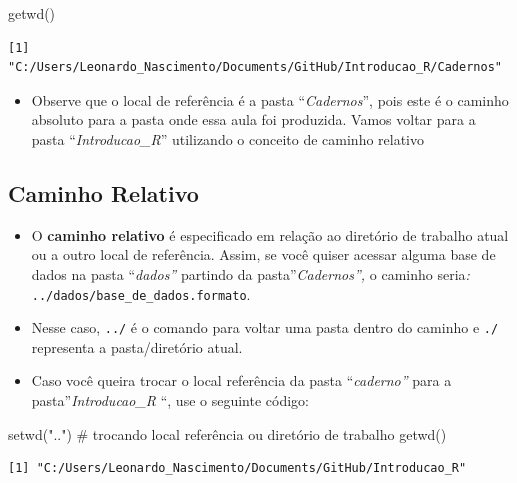 \documentclass[
  letterpaper,
  DIV=11,
  numbers=noendperiod]{scrartcl}
\newenvironment{Shaded}{\begin{snugshade}}{\end{snugshade}}
\newcommand{\CommentTok}[1]{\textcolor[rgb]{0.37,0.37,0.37}{#1}}
\newcommand{\FunctionTok}[1]{\textcolor[rgb]{0.28,0.35,0.67}{#1}}
\newcommand{\NormalTok}[1]{\textcolor[rgb]{0.00,0.23,0.31}{#1}}
\newcommand{\StringTok}[1]{\textcolor[rgb]{0.13,0.47,0.30}{#1}}
\providecommand{\tightlist}{%
  \setlength{\itemsep}{0pt}\setlength{\parskip}{0pt}}\usepackage{longtable,booktabs,array}
\begin{document}
\begin{Shaded}
\begin{Highlighting}[]
\FunctionTok{getwd}\NormalTok{()}
\end{Highlighting}
\end{Shaded}

\begin{verbatim}
[1] "C:/Users/Leonardo_Nascimento/Documents/GitHub/Introducao_R/Cadernos"
\end{verbatim}

\begin{itemize}
\tightlist
\item
  Observe que o local de referência é a pasta ``\emph{Cadernos}'', pois
  este é o caminho absoluto para a pasta onde essa aula foi produzida.
  Vamos voltar para a pasta ``\emph{Introducao\_R}'' utilizando o
  conceito de caminho relativo
\end{itemize}

\subsection{Caminho Relativo}\label{caminho-relativo}

\begin{itemize}
\item
  O \textbf{caminho relativo} é especificado em relação ao diretório de
  trabalho atual ou a outro local de referência. Assim, se você quiser
  acessar alguma base de dados na pasta ``\emph{dados''} partindo da
  pasta''\emph{Cadernos'',} o caminho seria\emph{:}
  \texttt{../dados/base\_de\_dados.formato}.
\item
  Nesse caso, \texttt{../} é o comando para voltar uma pasta dentro do
  caminho e \texttt{./} representa a pasta/diretório atual.
\item
  Caso você queira trocar o local referência da pasta ``\emph{caderno''}
  para a pasta''\emph{Introducao\_R} ``, use o seguinte código:
\end{itemize}

\begin{Shaded}
\begin{Highlighting}[]
\FunctionTok{setwd}\NormalTok{(}\StringTok{".."}\NormalTok{) }\CommentTok{\# trocando local referência ou diretório de trabalho}
\FunctionTok{getwd}\NormalTok{()}
\end{Highlighting}
\end{Shaded}

\begin{verbatim}
[1] "C:/Users/Leonardo_Nascimento/Documents/GitHub/Introducao_R"
\end{verbatim}
\end{document}
